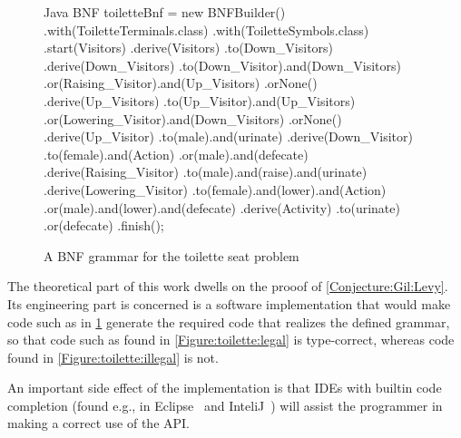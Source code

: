 \begin{figure}[htbp]
  \scriptsize
  \begin{lcode}{Java}
BNF toiletteBnf = new BNFBuilder()
  .with(ToiletteTerminals.class)
  .with(ToiletteSymbols.class)
  .start(Visitors)
  .derive(Visitors)
    .to(Down_Visitors)
  .derive(Down_Visitors)
    .to(Down_Visitor).and(Down_Visitors)
    .or(Raising_Visitor).and(Up_Visitors)
    .orNone()
  .derive(Up_Visitors)
    .to(Up_Visitor).and(Up_Visitors)
    .or(Lowering_Visitor).and(Down_Visitors)
    .orNone()
  .derive(Up_Visitor)
    .to(male).and(urinate)
  .derive(Down_Visitor)
    .to(female).and(Action)
    .or(male).and(defecate)
  .derive(Raising_Visitor)
    .to(male).and(raise).and(urinate)
  .derive(Lowering_Visitor)
    .to(female).and(lower).and(Action)
    .or(male).and(lower).and(defecate)
  .derive(Activity)
    .to(urinate)
    .or(defecate)
  .finish();
  \end{lcode}
  \caption{A BNF grammar for the toilette seat problem}
  \label{Figure:fluent}
\end{figure}
The theoretical part of this work dwells on the prooof of 
  \cref{Conjecture:Gil:Levy}.
Its engineering part is concerned is  
  a software implementation that would make code 
  such as in \cref{Figure:fluent} generate
  the required \Java code that realizes the 
  defined grammar, so that code such as 
  found in \cref{Figure:toilette:legal} is type-correct,
  whereas code found in \cref{Figure:toilette:illegal} is not.

An important side effect of the implementation is that IDEs with builtin code
completion 
 (found e.g., in Eclipse~\cite{Elcipse} and InteliJ~\cite{InteliJ}) 
 will assist the programmer in making a correct use of the API.
